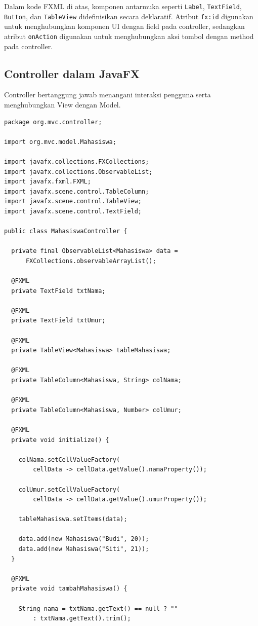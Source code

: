 Dalam kode FXML di atas, komponen antarmuka seperti \texttt{Label}, \texttt{TextField}, \texttt{Button}, dan \texttt{TableView} didefinisikan secara deklaratif. Atribut \texttt{fx:id} digunakan untuk menghubungkan komponen UI dengan field pada controller, sedangkan atribut \texttt{onAction} digunakan untuk menghubungkan aksi tombol dengan method pada controller.

\subsection{Controller dalam JavaFX}

Controller bertanggung jawab menangani interaksi pengguna serta menghubungkan View dengan Model.

\begin{lstlisting}[style=JavaStyle, caption=Controller dalam aplikasi JavaFX]
package org.mvc.controller;

import org.mvc.model.Mahasiswa;

import javafx.collections.FXCollections;
import javafx.collections.ObservableList;
import javafx.fxml.FXML;
import javafx.scene.control.TableColumn;
import javafx.scene.control.TableView;
import javafx.scene.control.TextField;

public class MahasiswaController {

  private final ObservableList<Mahasiswa> data =
      FXCollections.observableArrayList();

  @FXML
  private TextField txtNama;

  @FXML
  private TextField txtUmur;

  @FXML
  private TableView<Mahasiswa> tableMahasiswa;

  @FXML
  private TableColumn<Mahasiswa, String> colNama;

  @FXML
  private TableColumn<Mahasiswa, Number> colUmur;

  @FXML
  private void initialize() {

    colNama.setCellValueFactory(
        cellData -> cellData.getValue().namaProperty());

    colUmur.setCellValueFactory(
        cellData -> cellData.getValue().umurProperty());

    tableMahasiswa.setItems(data);

    data.add(new Mahasiswa("Budi", 20));
    data.add(new Mahasiswa("Siti", 21));
  }

  @FXML
  private void tambahMahasiswa() {

    String nama = txtNama.getText() == null ? ""
        : txtNama.getText().trim();


\end{lstlisting}
